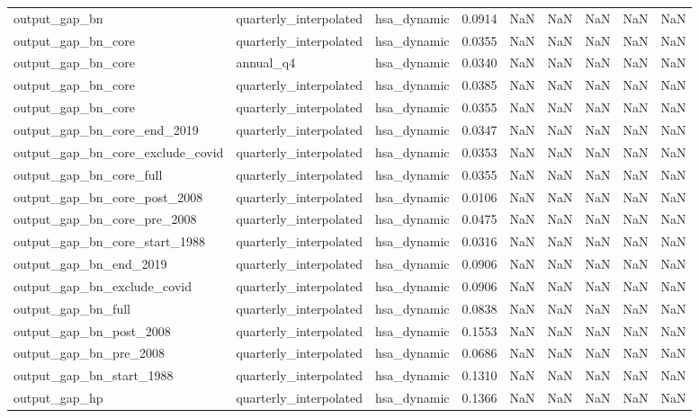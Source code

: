 \begin{tabular}{lllrrrrrr}
output\_gap\_bn & quarterly\_interpolated & hsa\_dynamic & 0.0914 & NaN & NaN & NaN & NaN & NaN \\
output\_gap\_bn\_core & quarterly\_interpolated & hsa\_dynamic & 0.0355 & NaN & NaN & NaN & NaN & NaN \\
output\_gap\_bn\_core & annual\_q4 & hsa\_dynamic & 0.0340 & NaN & NaN & NaN & NaN & NaN \\
output\_gap\_bn\_core & quarterly\_interpolated & hsa\_dynamic & 0.0385 & NaN & NaN & NaN & NaN & NaN \\
output\_gap\_bn\_core & quarterly\_interpolated & hsa\_dynamic & 0.0355 & NaN & NaN & NaN & NaN & NaN \\
output\_gap\_bn\_core\_end\_2019 & quarterly\_interpolated & hsa\_dynamic & 0.0347 & NaN & NaN & NaN & NaN & NaN \\
output\_gap\_bn\_core\_exclude\_covid & quarterly\_interpolated & hsa\_dynamic & 0.0353 & NaN & NaN & NaN & NaN & NaN \\
output\_gap\_bn\_core\_full & quarterly\_interpolated & hsa\_dynamic & 0.0355 & NaN & NaN & NaN & NaN & NaN \\
output\_gap\_bn\_core\_post\_2008 & quarterly\_interpolated & hsa\_dynamic & 0.0106 & NaN & NaN & NaN & NaN & NaN \\
output\_gap\_bn\_core\_pre\_2008 & quarterly\_interpolated & hsa\_dynamic & 0.0475 & NaN & NaN & NaN & NaN & NaN \\
output\_gap\_bn\_core\_start\_1988 & quarterly\_interpolated & hsa\_dynamic & 0.0316 & NaN & NaN & NaN & NaN & NaN \\
output\_gap\_bn\_end\_2019 & quarterly\_interpolated & hsa\_dynamic & 0.0906 & NaN & NaN & NaN & NaN & NaN \\
output\_gap\_bn\_exclude\_covid & quarterly\_interpolated & hsa\_dynamic & 0.0906 & NaN & NaN & NaN & NaN & NaN \\
output\_gap\_bn\_full & quarterly\_interpolated & hsa\_dynamic & 0.0838 & NaN & NaN & NaN & NaN & NaN \\
output\_gap\_bn\_post\_2008 & quarterly\_interpolated & hsa\_dynamic & 0.1553 & NaN & NaN & NaN & NaN & NaN \\
output\_gap\_bn\_pre\_2008 & quarterly\_interpolated & hsa\_dynamic & 0.0686 & NaN & NaN & NaN & NaN & NaN \\
output\_gap\_bn\_start\_1988 & quarterly\_interpolated & hsa\_dynamic & 0.1310 & NaN & NaN & NaN & NaN & NaN \\
output\_gap\_hp & quarterly\_interpolated & hsa\_dynamic & 0.1366 & NaN & NaN & NaN & NaN & NaN \\

\end{tabular}
